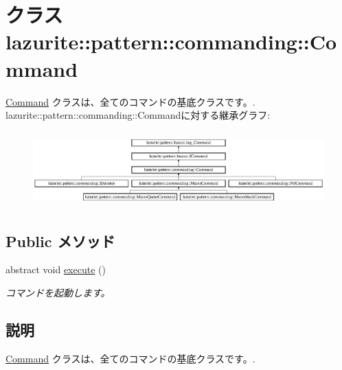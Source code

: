 \hypertarget{classlazurite_1_1pattern_1_1commanding_1_1_command}{
\section{クラス lazurite::pattern::commanding::Command}
\label{classlazurite_1_1pattern_1_1commanding_1_1_command}
}


\hyperlink{classlazurite_1_1pattern_1_1commanding_1_1_command}{Command} クラスは、全てのコマンドの基底クラスです。.  
lazurite::pattern::commanding::Commandに対する継承グラフ:\begin{figure}[H]
\begin{center}
\leavevmode
\includegraphics[height=2.93501cm]{classlazurite_1_1pattern_1_1commanding_1_1_command}
\end{center}
\end{figure}
\subsection*{Public メソッド}
\begin{DoxyCompactItemize}
\item 
abstract void \hyperlink{classlazurite_1_1pattern_1_1commanding_1_1_command_afd9750cf772a6a65b1a1e11d8313fe03}{execute} ()
\begin{DoxyCompactList}\small\item\em コマンドを起動します。 \item\end{DoxyCompactList}\end{DoxyCompactItemize}


\subsection{説明}
\hyperlink{classlazurite_1_1pattern_1_1commanding_1_1_command}{Command} クラスは、全てのコマンドの基底クラスです。. 

